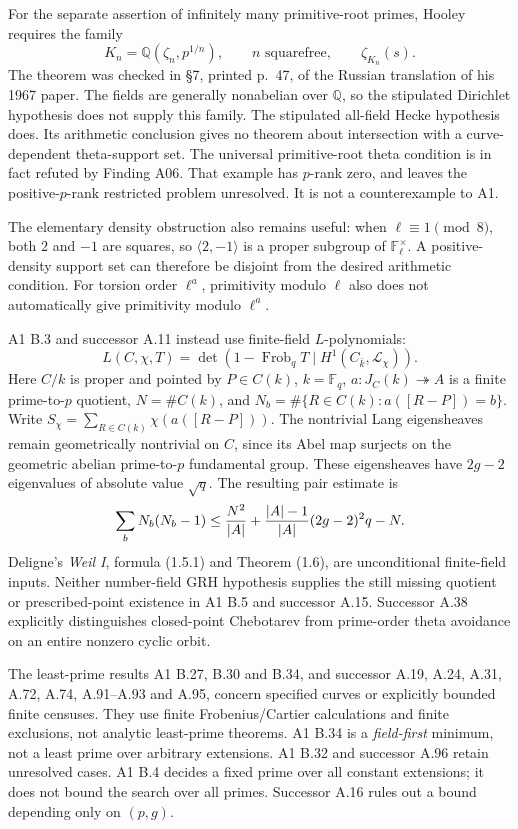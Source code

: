 For the separate assertion of infinitely many primitive-root primes,
Hooley requires the family
\[
 K_n=\mathbb Q(\zeta_n,p^{1/n}),\qquad n\text{ squarefree},
 \qquad \zeta_{K_n}(s).
\]
The theorem was checked in \S7, printed p.~47, of the Russian
translation of his 1967 paper. The fields are generally nonabelian
over $\mathbb Q$, so the stipulated Dirichlet hypothesis does not
supply this family. The stipulated all-field Hecke hypothesis does.
Its arithmetic conclusion gives no theorem about intersection with a
curve-dependent theta-support set. The universal primitive-root theta
condition is in fact refuted by Finding A06. That example has
$p$-rank zero, and leaves the positive-$p$-rank restricted problem
unresolved. It is not a counterexample to A1.

The elementary density obstruction also remains useful: when
$\ell\equiv1\pmod8$, both $2$ and $-1$ are squares, so
$\langle2,-1\rangle$ is a proper subgroup of
$\mathbb F_\ell^\times$. A positive-density support set can therefore
be disjoint from the desired arithmetic condition. For torsion order
$\ell^a$, primitivity modulo $\ell$ also does not automatically
give primitivity modulo $\ell^a$.

A1 B.3 and successor A.11 instead use finite-field $L$-polynomials:
\[
 L(C,\chi,T)=\det(1-\operatorname{Frob}_qT
                  \mid H^1(C_{\bar k},\mathcal L_\chi)).
\]
Here $C/k$ is proper and pointed by $P\in C(k)$, $k=\mathbb F_q$,
$a:J_C(k)\twoheadrightarrow A$ is a finite prime-to-$p$ quotient,
$N=\#C(k)$, and
$N_b=\#\{R\in C(k):a([R-P])=b\}$.
Write $S_\chi=\sum_{R\in C(k)}\chi(a([R-P]))$.
The nontrivial Lang eigensheaves remain geometrically nontrivial
on $C$, since its Abel map surjects on the geometric abelian
prime-to-$p$ fundamental group. These eigensheaves have $2g-2$
eigenvalues of absolute value $\sqrt q$. The resulting pair estimate is
\[
 \sum_bN_b(N_b-1)
 \le {N^2\over|A|}
   +{|A|-1\over|A|}(2g-2)^2q-N.
\]
Deligne's \emph{Weil I}, formula (1.5.1) and Theorem (1.6), are
unconditional finite-field inputs. Neither number-field GRH hypothesis
supplies the still missing quotient or prescribed-point existence in
A1 B.5 and successor A.15. Successor A.38 explicitly distinguishes
closed-point Chebotarev from prime-order theta avoidance on an entire
nonzero cyclic orbit.

The least-prime results A1 B.27, B.30 and B.34, and successor
A.19, A.24, A.31, A.72, A.74, A.91--A.93 and A.95, concern specified
curves or explicitly bounded finite censuses. They use finite
Frobenius/Cartier calculations and finite exclusions, not analytic
least-prime theorems. A1 B.34 is a \emph{field-first} minimum, not a
least prime over arbitrary extensions. A1 B.32 and successor A.96
retain unresolved cases. A1 B.4 decides a fixed prime over all
constant extensions; it does not bound the search over all primes.
Successor A.16 rules out a bound depending only on $(p,g)$.

